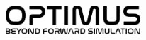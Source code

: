 \begin{frame}
\begin{columns}
\begin{figure}
        \end{figure}
        \begin{figure}
            \centering
            \includegraphics[width=0.8\textwidth]{siam_pp_24/Optimus-2-cropped.svg}
        \end{figure}
    \end{columns}
\end{frame}